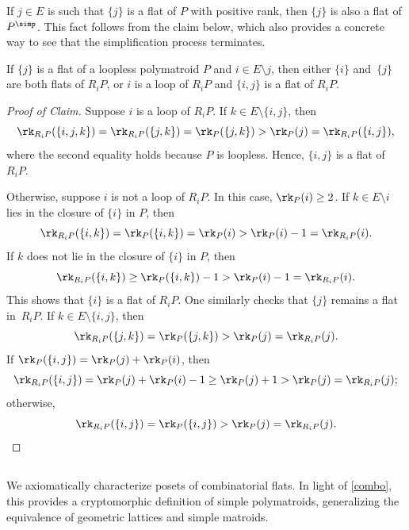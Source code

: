 \begin{rema}
  If $j \in E$ is such that $\{j\}$ is a flat of $P$ with positive rank, then $\{j\}$ is also a flat of $P^\simp$.
  This fact follows from the claim below, which also provides a concrete way to see that the simplification process terminates.
    \begin{claim}
    If $\{j\}$ is a flat of a loopless polymatroid $P$ and $i \in E \setminus j$, then either $\{i\}$ and~$\{j\}$ are both flats of $R_i P$, or $i$ is a loop of $R_i P$ and $\{i,j\}$ is a flat of $R_i P$.
  \end{claim}
  \begin{proof}[Proof of Claim]
    Suppose $i$ is a loop of $R_i P$.
    If $k \in E \setminus \{i,j\}$, then
    \[ \rk_{R_i P}(\{i,j,k\}) = \rk_{R_i P}(\{j,k\}) = \rk_P(\{j,k\}) > \rk_P(j) = \rk_{R_i P}(\{i,j\}), \]
    where the second equality holds because $P$ is loopless. Hence, $\{i,j\}$ is a flat of $R_i P$.

    Otherwise, suppose $i$ is not a loop of $R_i P$. In this case, $\rk_P(i) \geq 2$.
    If $k \in E \setminus i$ lies in the closure of $\{i\}$ in $P$, then
    \[
      \rk_{R_i P}(\{i,k\}) = \rk_P(\{i,k\}) = \rk_P(i) > \rk_P(i) - 1 = \rk_{R_i P}(i).
    \]
    If $k$ does not lie in the closure of $\{i\}$ in $P$, then
    \[
      \rk_{R_i P}(\{i,k\}) \geq \rk_P(\{i,k\}) - 1 > \rk_P(i) - 1 = \rk_{R_i P}(i).
    \]
    This shows that $\{i\}$ is a flat of $R_i P$. One similarly checks that $\{j\}$ remains a flat in~$R_i P$.
    If $k \in E \setminus \{i,j\}$, then
    \[
      \rk_{R_i P}(\{j,k\}) = \rk_P(\{j,k\}) > \rk_P(j) = \rk_{R_i P}(j).
    \]
    If $\rk_P(\{i,j\}) = \rk_P(j) + \rk_P(i)$, then
    \[
      \rk_{R_i P}(\{i,j\}) = \rk_P(j) + \rk_P(i) - 1 \geq \rk_P(j) + 1 > \rk_P(j) = \rk_{R_i P}(j);
    \]
    otherwise,
    \[
      \rk_{R_i P}(\{i,j\}) = \rk_P(\{i,j\}) > \rk_P(j) = \rk_{R_i P}(j).\qedhere
    \]
  \end{proof}
\end{rema}

\subsection{}\label{comboflataxioms}
We axiomatically characterize posets of combinatorial flats.
In light of \cref{combo}, this provides a cryptomorphic definition of simple polymatroids, generalizing the equivalence of geometric lattices and simple matroids.

